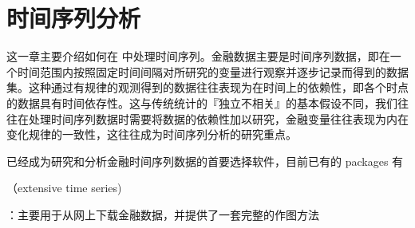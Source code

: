 
\chapter{时间序列分析}

这一章主要介绍如何在 \R 中处理{\kai 时间序列}。金融数据主要是时间序列数据，即在一个时间范围内按照固定时间间隔对所研究的变量进行观察并逐步记录而得到的数据集。这种通过有规律的观测得到的数据往往表现为在时间上的依赖性，即各个时点的数据具有时间依存性。这与传统统计的『独立不相关』的基本假设不同，我们往往在处理时间序列数据时需要将数据的依赖性加以研究，金融变量往往表现为内在变化规律的一致性，这往往成为时间序列分析的研究重点。

\R 已经成为研究和分析金融时间序列数据的首要选择软件，目前已有的 packages 有
\begin{compactenum}
\item {}
\item {}（extensive time series)
\item {}
\item {}：主要用于从网上下载金融数据，并提供了一套完整的作图方法
\end{compactenum}
\begin{mdfbox}[quantmod]

\end{mdfbox} 

